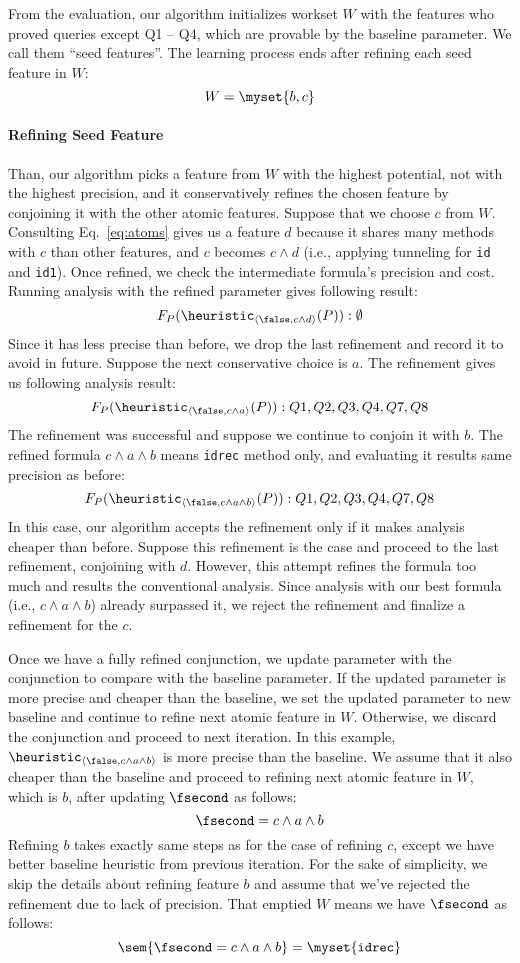 From the evaluation, our algorithm initializes workset $W$ with the features who proved queries except Q1 -- Q4, which are provable by the baseline parameter. We call them ``seed features''. The learning process ends after refining each seed feature in $W$:
\[
W=\myset{b, c}
\]

\paragraph{Refining Seed Feature} Than, our algorithm picks a feature from $W$ with the highest potential, not with the highest precision, and it conservatively refines the chosen feature by conjoining it with the other atomic features. Suppose that we choose $c$ from $W$. Consulting Eq.~\ref{eq:atoms} gives us a feature $d$ because it shares many methods with $c$ than other features, and $c$ becomes $c\land d$ (i.e., applying tunneling for \texttt{id} and \texttt{id1}). Once refined, we check the intermediate formula's precision and cost. Running analysis with the refined parameter gives following result:
\[
F_P(\heuristic_{\langle \false, c \land d \rangle}(P)) : \emptyset
\]
Since it has less precise than before, we drop the last refinement and record it to avoid in future. Suppose the next conservative choice is $a$. The refinement gives us following analysis result:
\[
F_P(\heuristic_{\langle \false, c \land a \rangle}(P)) : Q1, Q2, Q3, Q4, Q7, Q8
\]
The refinement was successful and suppose we continue to conjoin it with $b$. The refined formula $c \land a \land b$ means \texttt{idrec} method only, and evaluating it results same precision as before:
\[
F_P(\heuristic_{\langle \false, c \land a \land b\rangle}(P)) : Q1, Q2, Q3, Q4, Q7, Q8
\]
In this case, our algorithm accepts the refinement only if it makes analysis cheaper than before. Suppose this refinement is the case and proceed to the last refinement, conjoining with $d$. However, this attempt refines the formula too much and results the conventional analysis. Since analysis with our best formula (i.e., $c \land a \land b$) already surpassed it, we reject the refinement and finalize a refinement for the $c$.

Once we have a fully refined conjunction, we update parameter with the conjunction to compare with the baseline parameter. If the updated parameter is more precise and cheaper than the baseline, we set the updated parameter to new baseline and continue to refine next atomic feature in $W$. Otherwise, we discard the conjunction and proceed to next iteration. In this example, $\heuristic_{\langle \false, c \land a \land b\rangle}$ is more precise than the baseline. We assume that it also cheaper than the baseline and proceed to refining next atomic feature in $W$, which is $b$, after updating $\fsecond$ as follows:
\[
\fsecond = c \land a \land b
\]
Refining $b$ takes exactly same steps as for the case of refining $c$, except we have better baseline heuristic from previous iteration. For the sake of simplicity, we skip the details about refining feature $b$ and assume that we've rejected the refinement due to lack of precision. That emptied $W$ means we have $\fsecond$ as follows:
\[
\sem{\fsecond = c \land a \land b} = \myset{\texttt{idrec}}
\]

